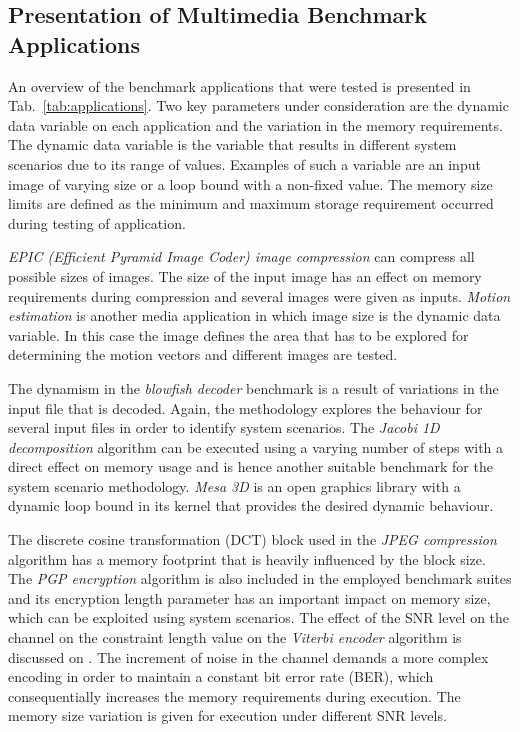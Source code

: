 \documentclass{acm_proc_article-sp}
\begin{document}
\subsection{Presentation of Multimedia Benchmark Applications}

An overview of the benchmark applications that were tested is presented in Tab.~\ref{tab:applications}. Two key parameters under consideration are the dynamic data variable on each application and the variation in the memory requirements. The dynamic data variable is the variable that results in different system scenarios due to its range of values. Examples of such a variable are an input image of varying size or a loop bound with a non-fixed value. The memory size limits are defined as the minimum and maximum storage requirement occurred during testing of application.

\textit{EPIC (Efficient Pyramid Image Coder) image compression} can compress all possible sizes of images. The size of the input image has an effect on memory requirements during compression and several images were given as inputs. \textit{Motion estimation} is another media application in which image size is the dynamic data variable. In this case the image defines the area that has to be explored for determining the motion vectors and different images are tested.

The dynamism in the \textit{blowfish decoder} benchmark is a result of variations in the input file that is decoded. Again, the methodology explores the behaviour for several input files in order to identify system scenarios. The \textit{Jacobi 1D decomposition} algorithm can be executed using a varying number of steps with a direct effect on memory usage and is hence another suitable benchmark for the system scenario methodology. \textit{Mesa 3D} is an open graphics library with a dynamic loop bound in its kernel that provides the desired dynamic behaviour. 

The discrete cosine transformation (DCT) block used in the \textit{JPEG compression} algorithm has a memory footprint that is heavily influenced by the block size. The \textit{PGP encryption} algorithm is also included in the employed benchmark suites and its encryption length parameter has an important impact on memory size, which can be exploited using system scenarios. The effect of the SNR level on the channel on the constraint length value on the \textit{Viterbi encoder} algorithm is discussed on \cite{Fil12}. The increment of noise in the channel demands a more complex encoding in order to maintain a constant bit error rate (BER), which consequentially increases the memory requirements during execution. The memory size variation is given for execution under different SNR levels.  
\end{document}
